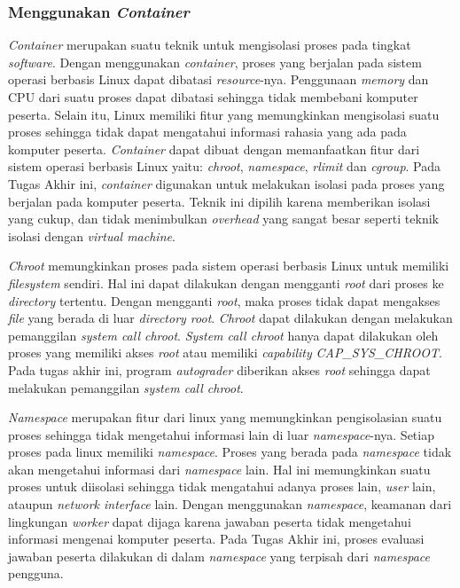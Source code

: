 \subsubsection{Menggunakan \textit{Container}}

\par \textit{Container} merupakan suatu teknik untuk mengisolasi proses pada tingkat \textit{software}. Dengan menggunakan \textit{container}, proses yang berjalan pada sistem operasi berbasis Linux dapat dibatasi \textit{resource}-nya. Penggunaan \textit{memory} dan CPU dari suatu proses dapat dibatasi sehingga tidak membebani komputer peserta. Selain itu, Linux memiliki fitur yang memungkinkan mengisolasi suatu proses sehingga tidak dapat mengatahui informasi rahasia yang ada pada komputer peserta. \textit{Container} dapat dibuat dengan memanfaatkan fitur dari sistem operasi berbasis Linux yaitu: \textit{chroot}, \textit{namespace}, \textit{rlimit} dan \textit{cgroup}. Pada Tugas Akhir ini, \textit{container} digunakan untuk melakukan isolasi pada proses yang berjalan pada komputer peserta. Teknik ini dipilih karena memberikan isolasi yang cukup, dan tidak menimbulkan \textit{overhead} yang sangat besar seperti teknik isolasi dengan \textit{virtual machine}.

\par \textit{Chroot} memungkinkan proses pada sistem operasi berbasis Linux untuk memiliki \textit{filesystem} sendiri. Hal ini dapat dilakukan dengan mengganti \textit{root} dari proses ke \textit{directory} tertentu. Dengan mengganti \textit{root}, maka proses tidak dapat mengakses \textit{file} yang berada di luar \textit{directory root}. \textit{Chroot} dapat dilakukan dengan melakukan pemanggilan \textit{system call chroot}. \textit{System call chroot} hanya dapat dilakukan oleh proses yang memiliki akses \textit{root} atau memiliki \textit{capability} \textit{CAP\_SYS\_CHROOT}. Pada tugas akhir ini, program \textit{autograder} diberikan akses \textit{root} sehingga dapat melakukan pemanggilan \textit{system call chroot}.

\par \textit{Namespace} merupakan fitur dari linux yang memungkinkan pengisolasian suatu proses sehingga tidak mengetahui informasi lain di luar \textit{namespace}-nya. Setiap proses pada linux memiliki \textit{namespace}. Proses yang berada pada \textit{namespace} tidak akan mengetahui informasi dari \textit{namespace} lain. Hal ini memungkinkan suatu proses untuk diisolasi sehingga tidak mengatahui adanya proses lain, \textit{user} lain, ataupun \textit{network interface} lain. Dengan menggunakan \textit{namespace}, keamanan dari lingkungan \textit{worker} dapat dijaga karena jawaban peserta tidak mengetahui informasi mengenai komputer peserta. Pada Tugas Akhir ini, proses evaluasi jawaban peserta dilakukan di dalam \textit{namespace} yang terpisah dari \textit{namespace} pengguna.

